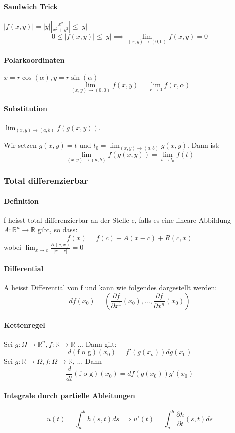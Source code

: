 \documentclass[a4paper, 9pt, DIV=24]{scrartcl}
\newcommand{\R}{\mathbb{R}}
\begin{document}
\paragraph*{Sandwich Trick} $|f(x,y)|=|y||\frac{x^2}{x^2+y^2}|\leq |y|$
$$ 0\leq |f(x,y)|\leq |y| \implies \lim_{(x,y)\rightarrow (0,0)} f(x,y)=0$$
\paragraph*{Polarkoordinaten} $x=r\cos (\alpha), y=r\sin (\alpha)$
$$\lim_{(x,y)\rightarrow (0,0)} f(x,y)=\lim_{r\rightarrow 0} f(r,\alpha)$$
\paragraph*{Substitution} $\lim_{(x,y)\rightarrow (a,b)} f(g(x,y))$. 

Wir setzen $g(x,y)=t \mbox{ und } t_0=\lim_{(x,y)\rightarrow (a,b)} g(x,y)$. Dann ist:
$$\lim_{(x,y)\rightarrow (a,b)} f(g(x,y))=\lim_{t\rightarrow t_0} f(t)$$

\subsubsection{Total differenzierbar}
\paragraph*{Definition} f heisst total differenzierbar an der Stelle c, falls es eine lineare Abbildung $A: \R^n \rightarrow \R$ gibt, so dass:
$$f(x)=f(c)+A(x-c)+R(c,x)$$ wobei $\lim_{x\rightarrow c} \frac{R(c,x)}{|x-c|}=0$
\paragraph*{Differential} A heisst Differential von f und kann wie folgendes dargestellt werden:
$$df(x_0)=\left( \frac{\partial f}{\partial x^1}(x_0),..., \frac{\partial f}{\partial x^n}(x_0) \right)$$
\paragraph*{Kettenregel} Sei $g:\Omega \rightarrow \R^n, f:\R \rightarrow \R$ ... Dann gilt:
$$d(\mbox{f o g})(x_0)=f'(g(x_o))dg(x_0)$$
Sei $g: \R \rightarrow \Omega, f: \Omega \rightarrow \R$, ... Dann
$$\frac{d}{dt}(\mbox{f o g})(x_0)=df(g(x_0))g'(x_0)$$
\paragraph*{Integrale durch partielle Ableitungen}
$$u(t)=\int_a^b h(s,t)ds \implies u'(t)=\int_a^b \frac{\partial h}{\partial t}(s,t)ds$$
\end{document}
